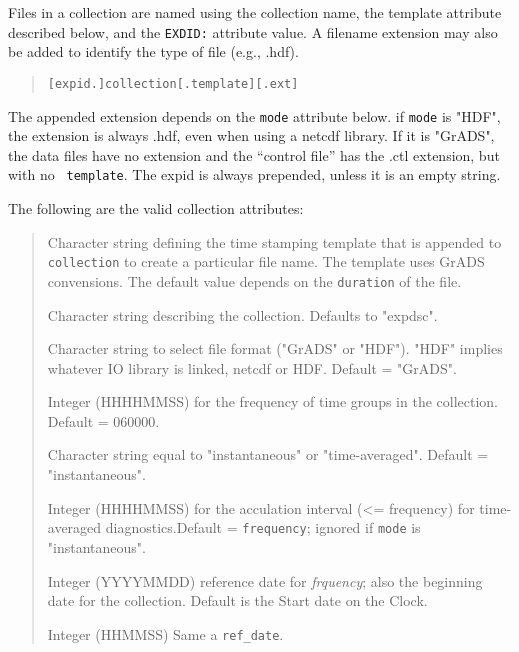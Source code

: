 Files in a collection are named using the collection name, the
template attribute described below, and the {\tt EXDID:} attribute
value. A filename extension may also be added to identify the type of
file (e.g., .hdf).
\begin{quote}
    {\tt [expid.]collection[.template][.ext]}
\end{quote}
The appended extension depends on the {\tt mode} attribute below. if
{\tt mode} is "HDF", the extension is always .hdf, even when using a
netcdf library. If it is "GrADS", the data files have no extension and
the ``control file'' has the .ctl extension, but with no {\tt
template}. The expid is always prepended, unless it is an empty
string.

The following are the valid collection attributes:
\begin{quote}
\begin{trivlist}
\item[\tt template]      Character string defining the time stamping template that is appended 
                         to {\tt collection} to create a particular file name. 
                         The template uses GrADS convensions. 
                         The default value depends on the {\tt duration} of the file.
\item[\tt descr]         Character string describing the collection. Defaults to "expdsc".
\item[\tt format]        Character string to select file format ("GrADS" or "HDF").  "HDF" 
                         implies whatever IO library is linked, netcdf or HDF.
                         Default = "GrADS".
\item[\tt frequency]     Integer (HHHHMMSS) for the frequency of time groups in the collection.
                         Default = 060000.
\item[\tt mode]          Character string equal to "instantaneous" or "time-averaged".
                         Default = "instantaneous".
\item[\tt acc\_interval] Integer (HHHHMMSS) for the acculation interval (<= frequency)
                         for time-averaged diagnostics.Default = {\tt frequency}; ignored
                         if {\tt mode} is "instantaneous".
\item[\tt ref\_date]     Integer (YYYYMMDD) reference date for {\em frquency};
                         also the beginning date for
                         the collection. Default is the Start date on the Clock.
\item[\tt ref\_time]     Integer (HHMMSS) Same a {\tt ref\_date}.

\end{trivlist}
\end{quote}
